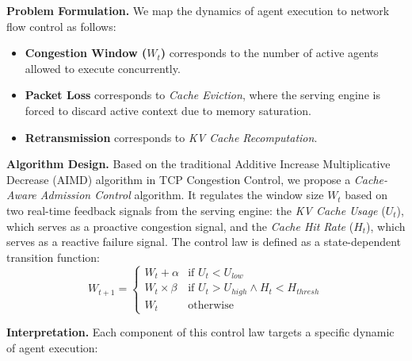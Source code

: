 \noindent\textbf{Problem Formulation.}
We map the dynamics of agent execution to network flow control as follows:
\begin{itemize}[nosep]
    \item[(1)] \textbf{Congestion Window ($W_t$)} corresponds to the number of active agents allowed to execute concurrently.
    \item[(2)] \textbf{Packet Loss} corresponds to \emph{Cache Eviction}, where the serving engine is forced to discard active context due to memory saturation.
    \item[(3)] \textbf{Retransmission} corresponds to \emph{KV Cache Recomputation}.
\end{itemize}

\noindent\textbf{Algorithm Design.} Based on the traditional Additive Increase Multiplicative Decrease (AIMD) algorithm in TCP Congestion Control, we propose a \emph{Cache-Aware Admission Control} algorithm. It regulates the window size $W_t$ based on two real-time feedback signals from the serving engine: the \emph{KV Cache Usage} ($U_t$), which serves as a proactive congestion signal, and the \emph{Cache Hit Rate} ($H_t$), which serves as a reactive failure signal.
The control law is defined as a state-dependent transition function:
\begin{equation}
W_{t+1} = \begin{cases} 
    W_t + \alpha & \text{if } U_t < U_{low} \\
    W_t \times \beta & \text{if } U_t > U_{high} \land H_t < H_{thresh} \\
    W_t & \text{otherwise}
\end{cases}
\end{equation}


\noindent\textbf{Interpretation.}
Each component of this control law targets a specific dynamic of agent execution:

